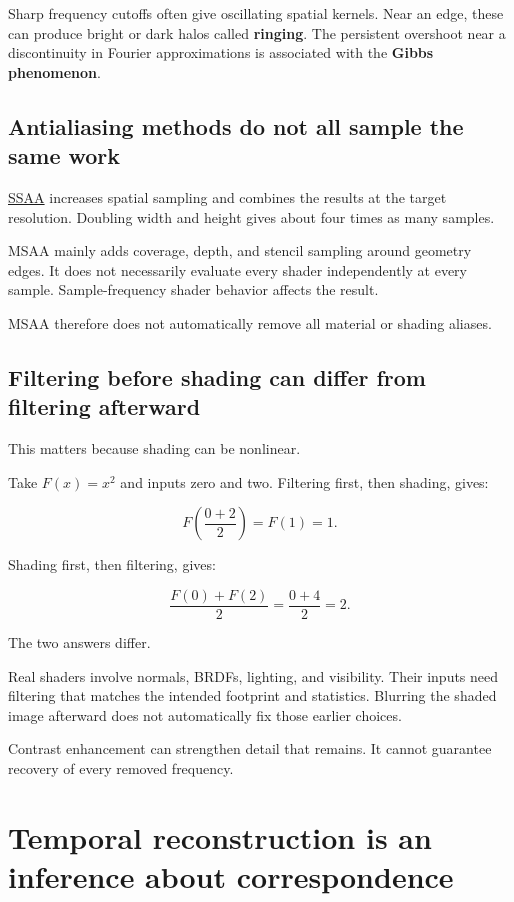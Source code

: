 Sharp frequency cutoffs often give oscillating spatial kernels. Near an edge, these can produce bright or dark halos called \textbf{ringing}. The persistent overshoot near a discontinuity in Fourier approximations is associated with the \textbf{Gibbs phenomenon}.

\subsection{Antialiasing methods do not all sample the same work}\label{04-visual-computing-ii-ch043-antialiasing-methods-do-not-all-sample-the-same-work}

\hyperref[appendix-4192b2bdd21e]{SSAA} increases spatial sampling and combines the results at the target resolution. Doubling width and height gives about four times as many samples.

MSAA mainly adds coverage, depth, and stencil sampling around geometry edges. It does not necessarily evaluate every shader independently at every sample. Sample-frequency shader behavior affects the result.

MSAA therefore does not automatically remove all material or shading aliases.

\subsection{Filtering before shading can differ from filtering afterward}\label{04-visual-computing-ii-ch043-filtering-before-shading-can-differ-from-filtering-afterward}

This matters because shading can be nonlinear.

Take \(F(x)=x^2\) and inputs zero and two. Filtering first, then shading, gives:

\[
F\left(\frac{0+2}{2}\right)=F(1)=1.
\]

Shading first, then filtering, gives:

\[
\frac{F(0)+F(2)}2=\frac{0+4}2=2.
\]

The two answers differ.

Real shaders involve normals, BRDFs, lighting, and visibility. Their inputs need filtering that matches the intended footprint and statistics. Blurring the shaded image afterward does not automatically fix those earlier choices.

Contrast enhancement can strengthen detail that remains. It cannot guarantee recovery of every removed frequency.

\section{Temporal reconstruction is an inference about correspondence}\label{04-visual-computing-ii-ch043-temporal-reconstruction-is-an-inference-about-correspondence}

